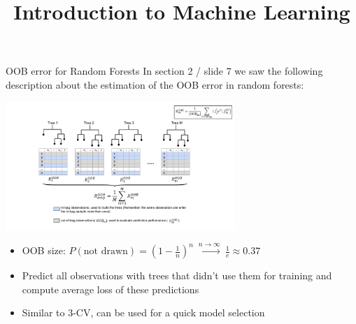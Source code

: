 \documentclass[11pt,compress,t,notes=noshow, xcolor=table]{beamer}
\title{Introduction to Machine Learning}
\institute{\href{https://compstat-lmu.github.io/lecture_i2ml/}{compstat-lmu.github.io/lecture\_i2ml}}
\date{}
\begin{document}












\sloppy



\begin{vbframe}{OOB error for Random Forests}
In section 2 / slide 7 we saw the following description about the estimation of the OOB error in random forests:
\begin{center}
\includegraphics[width=0.65\textwidth]{figure_man/rF_oob_error_new.pdf}
\end{center}

\begin{itemize}
  \item OOB size: $P(\text{not drawn}) = \left(1 - \frac{1}{n}\right)^n \ \stackrel{n \to \infty}{\longrightarrow} \ \frac{1}{e} \approx 0.37$
  \item Predict all observations with trees that didn't use them for training and compute average loss of these predictions
  \item Similar to 3-CV, can be used for a quick model selection
\end{itemize}


\end{vbframe}
\end{document}

